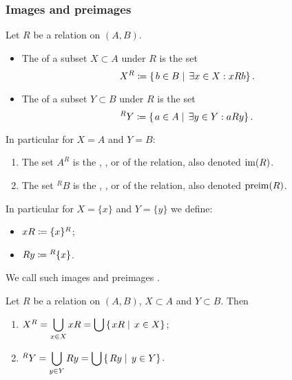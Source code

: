 \subsubsection{Images and preimages}
\begin{definition}
Let $R$ be a relation on $(A, B)$.
\begin{itemize}
\item The  of a subset $X\subset A$ under $R$ is the set
\[ X^R \coloneqq \left\{\left. b\in B \;\right|\; \exists x\in X: xRb \right\}. \]
\item The  of a subset $Y\subset B$ under $R$ is the set
\[ ^RY \coloneqq \left\{\left. a\in A \;\right|\; \exists y\in Y: aRy \right\}. \]
\end{itemize}
In particular for $X=A$ and $Y=B$:
\begin{enumerate}
\item The set $A^R$ is the , ,  or  of the relation, also denoted $\operatorname{im}(R)$.
\item The set $^RB$ is the , ,  or  of the relation, also denoted $\operatorname{preim}(R)$.
\end{enumerate}
In particular for $X = \{x\}$ and $Y = \{y\}$ we define:
\begin{itemize}
\item $xR \coloneqq \{x\}^R$;
\item $Ry \coloneqq {^R\{x\}}$.
\end{itemize}
We call such images and preimages .
\end{definition}

\begin{lemma}
Let $R$ be a relation on $(A, B)$, $X\subset A$ and $Y\subset B$. Then
\begin{enumerate}
\item $X^R = \displaystyle\bigcup_{x\in X}xR = \bigcup \left\{\left. xR \;\right|\; x\in X \right\}$;
\item $^RY = \displaystyle\bigcup_{y\in Y}Ry = \bigcup \left\{\left. Ry \;\right|\; y\in Y \right\}$.
\end{enumerate}
\end{lemma}


